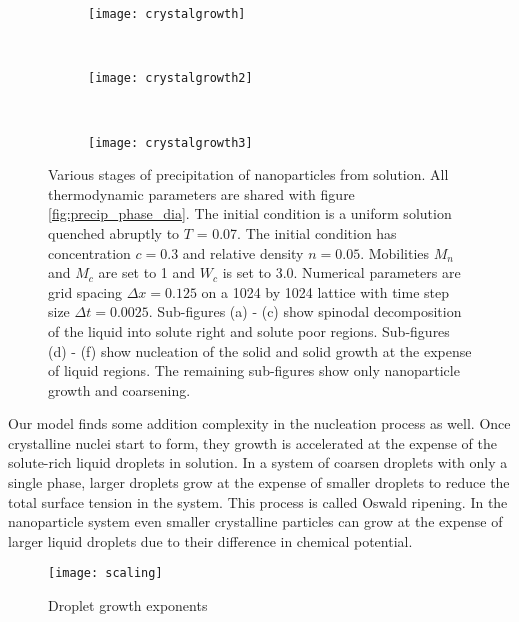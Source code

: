 \begin{figure}
    \vspace{0.25cm}
    \begin{subfigure}[b]{0.3\textwidth}
        \texttt{[image: crystalgrowth]}
        \label{fig:crystalgrowth}
        \caption{}
    \end{subfigure}
    ~
    \begin{subfigure}[b]{0.3\textwidth}
        \texttt{[image: crystalgrowth2]}
        \label{fig:crystalgrowth2}
        \caption{}
    \end{subfigure}
    ~ 
    \begin{subfigure}[b]{0.3\textwidth}
        \texttt{[image: crystalgrowth3]}
        \label{fig:crystalgrowth3}
        \caption{}
    \end{subfigure}
    \label{fig:precipitation}
    \caption[Stages of precipitation of nanoparticles from solution]{
        Various stages of precipitation of nanoparticles from solution. All
        thermodynamic parameters are shared with figure
        \ref{fig:precip_phase_dia}. The initial condition is a uniform solution
        quenched abruptly to $T$ = 0.07. The initial condition has
        concentration $c = 0.3$ and relative density $n = 0.05$. Mobilities
        $M_n$ and $M_c$ are set to 1 and $W_c$ is set to 3.0. Numerical
        parameters are grid spacing $\Delta x = 0.125$ on a 1024 by 1024
        lattice with time step size $\Delta t = 0.0025$. Sub-figures (a) - (c)
        show spinodal decomposition of the liquid into solute right and solute
        poor regions. Sub-figures (d) - (f) show nucleation of the solid and
        solid growth at the expense of liquid regions.  The remaining
        sub-figures show only nanoparticle growth and coarsening.
    }
\end{figure}

Our model finds some addition complexity in the nucleation process as well. Once
crystalline nuclei start to form, they growth is accelerated at the expense of 
the solute-rich liquid droplets in solution. In a system of coarsen droplets with
only a single phase, larger droplets grow at the expense of smaller droplets to reduce
the total surface tension in the system. This process is called Oswald ripening. In the
nanoparticle system even smaller crystalline particles can grow at the expense of larger
liquid droplets due to their difference in chemical potential.

\begin{figure}
    \centering
    \texttt{[image: scaling]}
    \label{fig:scaling}
    \caption{Droplet growth exponents}
\end{figure}

